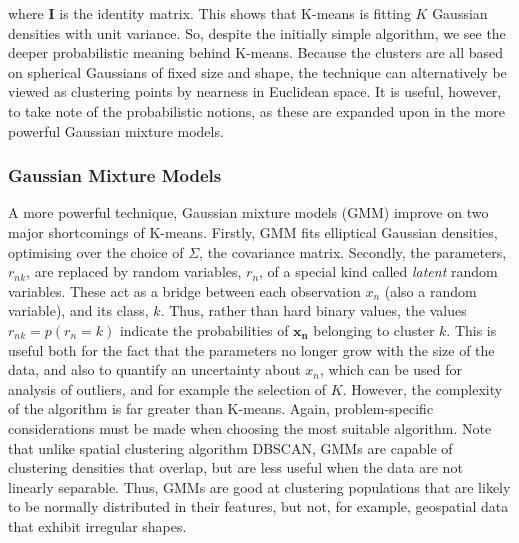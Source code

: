 \documentclass[11pt]{amsart}
\begin{document}
where $\mathbf{I}$ is the identity matrix. This shows that K-means is fitting $K$ Gaussian densities with unit variance. So, despite the initially simple algorithm, we see the deeper probabilistic meaning behind K-means. Because the clusters are all based on spherical Gaussians of fixed size and shape, the technique can alternatively be viewed as clustering points by nearness in Euclidean space. It is useful, however, to take note of the probabilistic notions, as these are expanded upon in the more powerful Gaussian mixture models.

\subsubsection{Gaussian Mixture Models}
A more powerful technique, Gaussian mixture models (GMM) improve on two major shortcomings of K-means. Firstly, GMM fits elliptical Gaussian densities, optimising over the choice of $\Sigma$, the covariance matrix. Secondly, the parameters, $r_{nk}$, are replaced by random variables, $r_n$, of a special kind called \emph{latent} random variables. These act as a bridge between each observation $x_n$ (also a random variable), and its class, $k$. Thus, rather than hard binary values, the values $r_{nk} = p(r_n = k)$ indicate the probabilities of $\mathbf{x_n}$ belonging to cluster $k$. This is useful both for the fact that the parameters no longer grow with the size of the data, and also to quantify an uncertainty about $x_n$, which can be used for analysis of outliers, and for example the selection of $K$. However, the complexity of the algorithm is far greater than K-means. Again, problem-specific considerations must be made when choosing the most suitable algorithm. Note that unlike spatial clustering algorithm DBSCAN, GMMs are capable of clustering densities that overlap, but are less useful when the data are not linearly separable. Thus, GMMs are good at clustering populations that are likely to be normally distributed in their features, but not, for example, geospatial data that exhibit irregular shapes.
\end{document}
